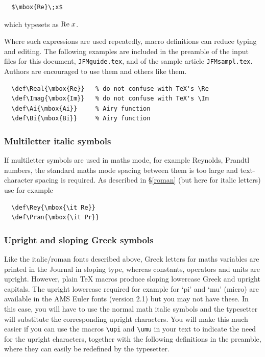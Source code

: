 \smallskip
\begin{verbatim}
  $\mbox{Re}\;x$
\end{verbatim}
\smallskip

\noindent which typesets as $\Real\;x$.

Where such expressions are used repeatedly, macro definitions can reduce
typing and editing. The following examples are included in the preamble
of the input files for this document, \verb"JFMguide.tex", and of the
sample article \verb"JFMsampl.tex". Authors are encouraged to use them
and others like them.

\smallskip
\begin{verbatim}  
  \def\Real{\mbox{Re}}   % do not confuse with TeX's \Re
  \def\Imag{\mbox{Im}}   % do not confuse with TeX's \Im
  \def\Ai{\mbox{Ai}}     % Airy function
  \def\Bi{\mbox{Bi}}     % Airy function
\end{verbatim}

\subsubsection{Multiletter italic symbols}
If multiletter symbols are used in maths mode, for example Reynolds, 
Prandtl numbers, \etc the standard maths mode spacing between them is 
too large and text-character spacing is required. As described 
in \S\ref{roman} (but here for italic letters) use for example

\smallskip
\begin{verbatim}
  \def\Rey{\mbox{\it Re}}
  \def\Pran{\mbox{\it Pr}}
\end{verbatim}

\subsubsection{Upright and sloping Greek symbols}
Like the italic/roman fonts described above, Greek letters for maths
variables are printed in the Journal in sloping type, whereas constants,
operators and units are upright. However, plain TeX macros produce sloping
lowercase Greek and upright capitals. The upright lowercase required for
example for `pi' and `mu' (micro)  are available in the AMS Euler fonts
(version 2.1) but you may not have
these. In this case, you will have to use the normal math italic symbols
and the typesetter will substitute the corresponding upright characters.
You will make this much easier if you can use the macros \verb"\upi" and
\verb"\umu" in your text to indicate the need for the upright characters,
together with the following definitions in the preamble, where they can
easily be redefined by the typesetter.

